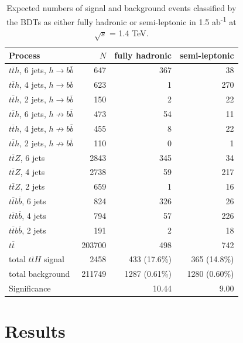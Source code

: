 \begin{table}[ht]
\centering
	\begin{tabular}{ l r r r }
	\hline \hline
	Process & $N$ & fully hadronic & semi-leptonic \\ \hline \hline
	$t\overline{t}h$, 6 jets, $h \rightarrow b\overline{b}$ & 647 & 367 & 38 \\
	$t\overline{t}h$, 4 jets, $h \rightarrow b\overline{b}$ & 623 & 1 & 270 \\ \hline
	$t\overline{t}h$, 2 jets, $h \rightarrow b\overline{b}$ & 150 & 2 & 22 \\

	$t\overline{t}h$, 6 jets, $h \not\rightarrow b\overline{b}$ & 473 & 54 & 11	 \\
	$t\overline{t}h$, 4 jets, $h \not\rightarrow b\overline{b}$ & 455 & 8 & 22\\
	$t\overline{t}h$, 2 jets, $h \not\rightarrow b\overline{b}$ & 110 & 0 & 1 \\

	$t\overline{t}Z$, 6 jets & 2843 & 345 & 34 \\
	$t\overline{t}Z$, 4 jets & 2738 & 59 & 217 \\
	$t\overline{t}Z$, 2 jets & 659 & 1 & 16 \\
	
	$t\overline{t}b\overline{b}$, 6 jets & 824 & 326 & 26 \\
	$t\overline{t}b\overline{b}$, 4 jets & 794 & 57 & 226 \\
	$t\overline{t}b\overline{b}$, 2 jets & 191 & 2 & 18 \\

	$t\overline{t}$ & 203700 & 498 & 742 \\ \hline

	total $t\overline{t}H$ signal & 2458 & 433 (17.6\%) & 365 (14.8\%) \\ 
	total background & 211749 & 1287 (0.61\%) & 1280 (0.60\%) \\
	Significance &   & 10.44 & 9.00 \\ \hline

	\end{tabular}
	\caption{Expected numbers of signal and background events classified by the \acrshort{BDT}s as either fully hadronic or semi-leptonic in 1.5 ab\textsuperscript{-1} at $\sqrt{s}$ = 1.4 TeV.}
	\label{table:physics/SM/selections}
\end{table}

\section{Results}

